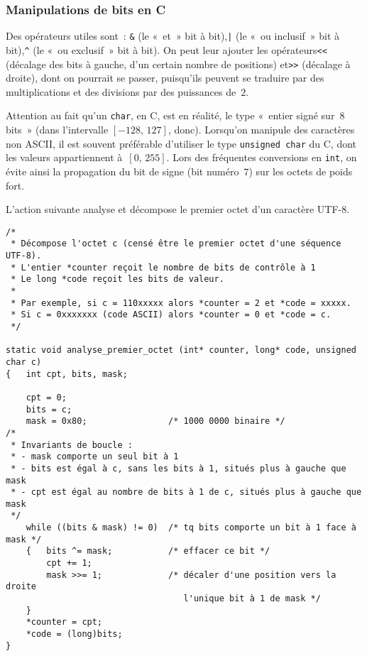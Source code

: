 \documentclass[12pt]{article}
\newcounter{points_counter}
\newcounter{section_points_counter}
\begin{document}
\subsubsection*{Manipulations de bits en C}

Des opérateurs utiles sont~: {\tt \&} (le «~et~» bit à bit),\verb+|+ 
(le «~ou inclusif~» bit à bit),\verb+^+ (le «~ou exclusif~» bit à bit). 
On peut leur ajouter les opérateurs\verb+<<+ (décalage des bits à gauche, d'un
certain nombre de positions) et\verb+>>+ (décalage à droite), dont on 
pourrait se passer, puisqu'ils peuvent se traduire par des multiplications
et des divisions par des puissances de~$2$. 

Attention au fait qu'un {\tt char}, en C, est en réalité, le type «~entier
signé sur~$8$ bits~» (dans l'intervalle $[-128,\, 127]$, donc). 
Lorsqu'on manipule des caractères non ASCII, il est souvent préférable 
d'utiliser le type {\tt unsigned char} du C, dont les valeurs appartiennent
à~$[0,\,255]$. Lors des fréquentes conversions en {\tt int}, on évite
ainsi la propagation du bit de signe (bit numéro~$7$) sur les octets 
de poids fort.

L'action suivante analyse et décompose le premier octet d'un caractère
UTF-8. 
\begin{verbatim}
/*
 * Décompose l'octet c (censé être le premier octet d'une séquence UTF-8).
 * L'entier *counter reçoit le nombre de bits de contrôle à 1
 * Le long *code reçoit les bits de valeur.
 *
 * Par exemple, si c = 110xxxxx alors *counter = 2 et *code = xxxxx.
 * Si c = 0xxxxxxx (code ASCII) alors *counter = 0 et *code = c.
 */

static void analyse_premier_octet (int* counter, long* code, unsigned char c)
{   int cpt, bits, mask;

    cpt = 0;
    bits = c;
    mask = 0x80;                /* 1000 0000 binaire */
/* 
 * Invariants de boucle : 
 * - mask comporte un seul bit à 1
 * - bits est égal à c, sans les bits à 1, situés plus à gauche que mask
 * - cpt est égal au nombre de bits à 1 de c, situés plus à gauche que mask
 */
    while ((bits & mask) != 0)  /* tq bits comporte un bit à 1 face à mask */
    {   bits ^= mask;           /* effacer ce bit */
        cpt += 1;
        mask >>= 1;             /* décaler d'une position vers la droite
                                   l'unique bit à 1 de mask */
    }
    *counter = cpt;
    *code = (long)bits;
}
\end{verbatim}
\end{document}
